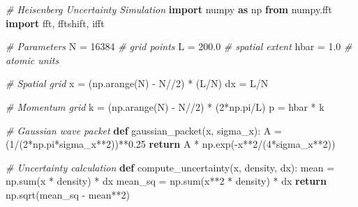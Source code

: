 \documentclass[
  11pt,
]{article}
\newenvironment{Shaded}{}{}
\newcommand{\BuiltInTok}[1]{\textcolor[rgb]{0.00,0.50,0.00}{#1}}
\newcommand{\CommentTok}[1]{\textcolor[rgb]{0.38,0.63,0.69}{\textit{#1}}}
\newcommand{\ControlFlowTok}[1]{\textcolor[rgb]{0.00,0.44,0.13}{\textbf{#1}}}
\newcommand{\DecValTok}[1]{\textcolor[rgb]{0.25,0.63,0.44}{#1}}
\newcommand{\FloatTok}[1]{\textcolor[rgb]{0.25,0.63,0.44}{#1}}
\newcommand{\ImportTok}[1]{\textcolor[rgb]{0.00,0.50,0.00}{\textbf{#1}}}
\newcommand{\KeywordTok}[1]{\textcolor[rgb]{0.00,0.44,0.13}{\textbf{#1}}}
\newcommand{\NormalTok}[1]{#1}
\newcommand{\OperatorTok}[1]{\textcolor[rgb]{0.40,0.40,0.40}{#1}}
\begin{document}
\begin{Shaded}
\begin{Highlighting}[]
\CommentTok{\# Heisenberg Uncertainty Simulation}
\ImportTok{import}\NormalTok{ numpy }\ImportTok{as}\NormalTok{ np}
\ImportTok{from}\NormalTok{ numpy.fft }\ImportTok{import}\NormalTok{ fft, fftshift, ifft}

\CommentTok{\# Parameters}
\NormalTok{N }\OperatorTok{=} \DecValTok{16384}  \CommentTok{\# grid points}
\NormalTok{L }\OperatorTok{=} \FloatTok{200.0}  \CommentTok{\# spatial extent}
\NormalTok{hbar }\OperatorTok{=} \FloatTok{1.0}  \CommentTok{\# atomic units}

\CommentTok{\# Spatial grid}
\NormalTok{x }\OperatorTok{=}\NormalTok{ (np.arange(N) }\OperatorTok{{-}}\NormalTok{ N}\OperatorTok{//}\DecValTok{2}\NormalTok{) }\OperatorTok{*}\NormalTok{ (L}\OperatorTok{/}\NormalTok{N)}
\NormalTok{dx }\OperatorTok{=}\NormalTok{ L}\OperatorTok{/}\NormalTok{N}

\CommentTok{\# Momentum grid}
\NormalTok{k }\OperatorTok{=}\NormalTok{ (np.arange(N) }\OperatorTok{{-}}\NormalTok{ N}\OperatorTok{//}\DecValTok{2}\NormalTok{) }\OperatorTok{*}\NormalTok{ (}\DecValTok{2}\OperatorTok{*}\NormalTok{np.pi}\OperatorTok{/}\NormalTok{L)}
\NormalTok{p }\OperatorTok{=}\NormalTok{ hbar }\OperatorTok{*}\NormalTok{ k}

\CommentTok{\# Gaussian wave packet}
\KeywordTok{def}\NormalTok{ gaussian\_packet(x, sigma\_x):}
\NormalTok{    A }\OperatorTok{=}\NormalTok{ (}\DecValTok{1}\OperatorTok{/}\NormalTok{(}\DecValTok{2}\OperatorTok{*}\NormalTok{np.pi}\OperatorTok{*}\NormalTok{sigma\_x}\OperatorTok{**}\DecValTok{2}\NormalTok{))}\OperatorTok{**}\FloatTok{0.25}
    \ControlFlowTok{return}\NormalTok{ A }\OperatorTok{*}\NormalTok{ np.exp(}\OperatorTok{{-}}\NormalTok{x}\OperatorTok{**}\DecValTok{2}\OperatorTok{/}\NormalTok{(}\DecValTok{4}\OperatorTok{*}\NormalTok{sigma\_x}\OperatorTok{**}\DecValTok{2}\NormalTok{))}

\CommentTok{\# Uncertainty calculation}
\KeywordTok{def}\NormalTok{ compute\_uncertainty(x, density, dx):}
\NormalTok{    mean }\OperatorTok{=}\NormalTok{ np.}\BuiltInTok{sum}\NormalTok{(x }\OperatorTok{*}\NormalTok{ density) }\OperatorTok{*}\NormalTok{ dx}
\NormalTok{    mean\_sq }\OperatorTok{=}\NormalTok{ np.}\BuiltInTok{sum}\NormalTok{(x}\OperatorTok{**}\DecValTok{2} \OperatorTok{*}\NormalTok{ density) }\OperatorTok{*}\NormalTok{ dx}
    \ControlFlowTok{return}\NormalTok{ np.sqrt(mean\_sq }\OperatorTok{{-}}\NormalTok{ mean}\OperatorTok{**}\DecValTok{2}\NormalTok{)}


\end{Highlighting}
\end{Shaded}
\end{document}
